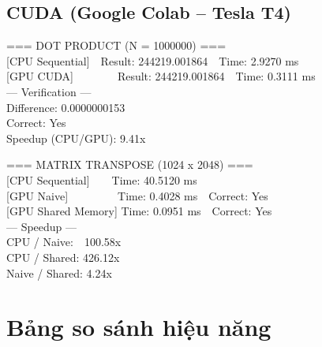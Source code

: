 \documentclass[12pt,a4paper]{article}
\begin{document}
\subsection{CUDA (Google Colab -- Tesla T4)}

\begin{tcolorbox}[title=Console Output -- Dot Product CUDA (nvcc + Tesla T4),colback=black!5]
\ttfamily\small
=== DOT PRODUCT (N = 1000000) ===\\[3pt]
{[CPU Sequential]}\ \ Result: 244219.001864\ \ Time: 2.9270 ms\\
{[GPU CUDA]}\ \ \ \ \ \ \ \ Result: 244219.001864\ \ Time: 0.3111 ms\\[3pt]
--- Verification ---\\
Difference: 0.0000000153\\
Correct: Yes\\
Speedup (CPU/GPU): 9.41x
\end{tcolorbox}

\begin{tcolorbox}[title=Console Output -- Matrix Transpose CUDA (nvcc + Tesla T4),colback=black!5]
\ttfamily\small
=== MATRIX TRANSPOSE (1024 x 2048) ===\\[3pt]
{[CPU Sequential]}\ \ \ \ Time: 40.5120 ms\\
{[GPU Naive]}\ \ \ \ \ \ \ \ \ Time: 0.4028 ms\ \ Correct: Yes\\
{[GPU Shared Memory]} Time: 0.0951 ms\ \ Correct: Yes\\[3pt]
--- Speedup ---\\
CPU / Naive:\ \ 100.58x\\
CPU / Shared: 426.12x\\
Naive / Shared: 4.24x
\end{tcolorbox}

\section{Bảng so sánh hiệu năng}
\end{document}
